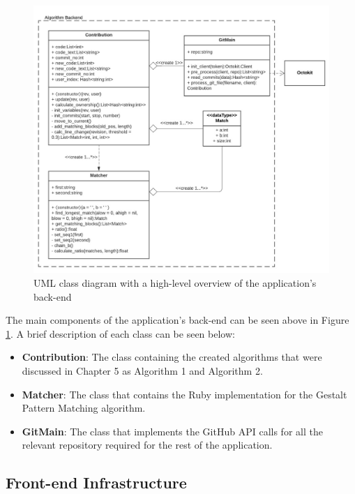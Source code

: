 \begin{figure}[h]
    \centering
    \includegraphics[scale=0.8]{images/UML class.jpeg}
    \caption{UML class diagram with a high-level overview of the application's back-end}
    \label{fig:7}
\end{figure}

The main components of the application's back-end can be seen above in Figure \ref{fig:7}. A brief description of each class can be seen below:
\begin{itemize}
    \item \textbf{Contribution}: The class containing the created algorithms that were discussed in Chapter 5 as Algorithm 1 and Algorithm 2.
    \item \textbf{Matcher}: The class that contains the Ruby implementation for the Gestalt Pattern Matching algorithm.
    \item \textbf{GitMain}: The class that implements the GitHub API calls for all the relevant repository required for the rest of the application.
\end{itemize}

\subsection{Front-end Infrastructure}

